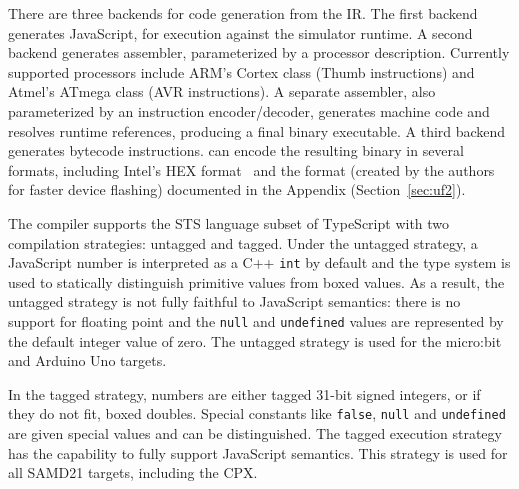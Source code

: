 There are three backends for code generation from the IR. The first backend generates JavaScript,
for execution against the simulator runtime.  A second backend generates assembler, parameterized by a
processor description.  Currently supported processors include ARM's Cortex class (Thumb instructions)
and Atmel's ATmega class (AVR instructions). A separate assembler, also parameterized by an instruction
encoder/decoder, generates machine code and resolves runtime references, producing a final binary executable. A third backend generates bytecode instructions.
\MC can encode the resulting binary in several formats,
including Intel's HEX format~\cite{IntelHEX} and the \UF format (created by
the authors for faster device flashing) documented in the Appendix (Section~\ref{sec:uf2}).

\label{sec:untagged-tagged}
The \MC compiler supports the STS language subset of TypeScript
with two compilation strategies: untagged and tagged. Under the untagged strategy,
a JavaScript number is interpreted as a C++ \texttt{int} by default and the type system is used
to statically distinguish primitive values from boxed values. As a result, the untagged
strategy is not fully faithful to JavaScript semantics: there is no support for floating
point and the \texttt{null} and \texttt{undefined} values are represented by the default integer value of zero. The untagged strategy is used for the micro:bit and Arduino Uno targets.

In the tagged strategy, numbers are either tagged 31-bit signed integers, or if they do not fit,
boxed doubles. Special constants like \texttt{false}, \texttt{null} and \texttt{undefined} are given special values
and can be distinguished. The tagged execution strategy has the capability to fully support
JavaScript semantics. This strategy is used for all SAMD21 targets, including the CPX.
